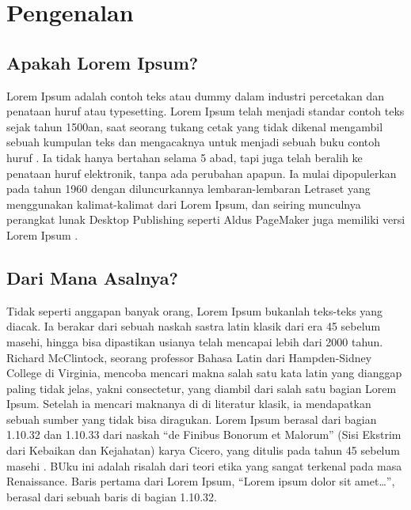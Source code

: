 \chapter{Pengenalan}
\label{bab:pengenalan}

\section{Apakah Lorem Ipsum?}
\label{sec:apadia}

Lorem Ipsum adalah contoh teks atau dummy dalam industri percetakan dan penataan huruf atau typesetting. Lorem Ipsum telah menjadi standar contoh teks sejak tahun 1500an, saat seorang tukang cetak yang tidak dikenal mengambil sebuah kumpulan teks dan mengacaknya untuk menjadi sebuah buku contoh huruf \cite{banerjee:pedersen:2003}. Ia tidak hanya bertahan selama 5 abad, tapi juga telah beralih ke penataan huruf elektronik, tanpa ada perubahan apapun. Ia mulai dipopulerkan pada tahun 1960 dengan diluncurkannya lembaran-lembaran Letraset yang menggunakan kalimat-kalimat dari Lorem Ipsum, dan seiring munculnya perangkat lunak Desktop Publishing seperti Aldus PageMaker juga memiliki versi Lorem Ipsum \cite{berment:phd:2004}.



\section{Dari Mana Asalnya?}
\label{sec:asal}

Tidak seperti anggapan banyak orang, Lorem Ipsum bukanlah teks-teks yang diacak. Ia berakar dari sebuah naskah sastra latin klasik dari era 45 sebelum masehi, hingga bisa dipastikan usianya telah mencapai lebih dari 2000 tahun. Richard McClintock, seorang professor Bahasa Latin dari Hampden-Sidney College di Virginia, mencoba mencari makna salah satu kata latin yang dianggap paling tidak jelas, yakni consectetur, yang diambil dari salah satu bagian Lorem Ipsum. Setelah ia mencari maknanya di di literatur klasik, ia mendapatkan sebuah sumber yang tidak bisa diragukan. Lorem Ipsum berasal dari bagian 1.10.32 dan 1.10.33 dari naskah ``de Finibus Bonorum et Malorum'' (Sisi Ekstrim dari Kebaikan dan Kejahatan) karya Cicero, yang ditulis pada tahun 45 sebelum masehi \cite{azarova:etal:2002,budanitsky:hirst:2006}. BUku ini adalah risalah dari teori etika yang sangat terkenal pada masa Renaissance. Baris pertama dari Lorem Ipsum, ``Lorem ipsum dolor sit amet\ldots'', berasal dari sebuah baris di bagian 1.10.32.

